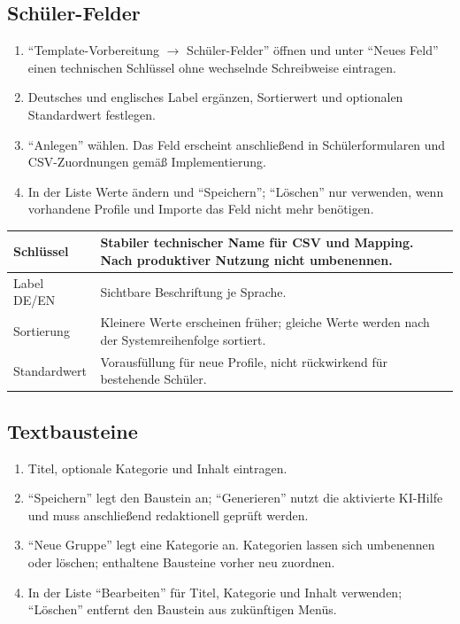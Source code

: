 \documentclass[12pt,a4paper]{article}
\begin{document}
\subsection{Schüler-Felder}
\begin{enumerate}
  \item \enquote{Template-Vorbereitung \(\rightarrow\) Schüler-Felder} öffnen und unter \enquote{Neues Feld} einen technischen Schlüssel ohne wechselnde Schreibweise eintragen.
  \item Deutsches und englisches Label ergänzen, Sortierwert und optionalen Standardwert festlegen.
  \item \enquote{Anlegen} wählen. Das Feld erscheint anschließend in Schülerformularen und CSV-Zuordnungen gemäß Implementierung.
  \item In der Liste Werte ändern und \enquote{Speichern}; \enquote{Löschen} nur verwenden, wenn vorhandene Profile und Importe das Feld nicht mehr benötigen.
\end{enumerate}

\begin{tabularx}{\textwidth}{|p{}|X|}
\hline
Schlüssel & Stabiler technischer Name für CSV und Mapping. Nach produktiver Nutzung nicht umbenennen.\\
\hline
Label DE/EN & Sichtbare Beschriftung je Sprache.\\
\hline
Sortierung & Kleinere Werte erscheinen früher; gleiche Werte werden nach der Systemreihenfolge sortiert.\\
\hline
Standardwert & Vorausfüllung für neue Profile, nicht rückwirkend für bestehende Schüler.\\
\hline
\end{tabularx}

\subsection{Textbausteine}\label{sec:textbausteine-verwalten}
\begin{enumerate}
  \item Titel, optionale Kategorie und Inhalt eintragen.
  \item \enquote{Speichern} legt den Baustein an; \enquote{Generieren} nutzt die aktivierte KI-Hilfe und muss anschließend redaktionell geprüft werden.
  \item \enquote{Neue Gruppe} legt eine Kategorie an. Kategorien lassen sich umbenennen oder löschen; enthaltene Bausteine vorher neu zuordnen.
  \item In der Liste \enquote{Bearbeiten} für Titel, Kategorie und Inhalt verwenden; \enquote{Löschen} entfernt den Baustein aus zukünftigen Menüs.
\end{enumerate}
\end{document}
